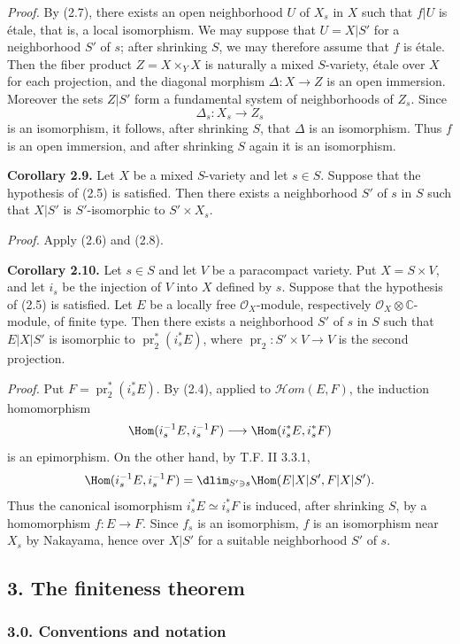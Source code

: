\documentclass[11pt]{article}
\begin{document}
\emph{Proof.} By (2.7), there exists an open neighborhood $U$ of $X_s$ in $X$ such that $f|U$ is étale, that is, a local isomorphism. We may suppose that $U=X|S'$ for a neighborhood $S'$ of $s$; after shrinking $S$, we may therefore assume that $f$ is étale. Then the fiber product $Z=X\times_YX$ is naturally a mixed $S$-variety, étale over $X$ for each projection, and the diagonal morphism $\Delta:X\to Z$ is an open immersion. Moreover the sets $Z|S'$ form a fundamental system of neighborhoods of $Z_s$. Since
\[
 \Delta_s:X_s\longrightarrow Z_s
\]
is an isomorphism, it follows, after shrinking $S$, that $\Delta$ is an isomorphism. Thus $f$ is an open immersion, and after shrinking $S$ again it is an isomorphism.

\textbf{Corollary 2.9.} Let $X$ be a mixed $S$-variety and let $s\in S$. Suppose that the hypothesis of (2.5) is satisfied. Then there exists a neighborhood $S'$ of $s$ in $S$ such that $X|S'$ is $S'$-isomorphic to $S'\times X_s$.

\emph{Proof.} Apply (2.6) and (2.8).

\textbf{Corollary 2.10.} Let $s\in S$ and let $V$ be a paracompact variety. Put $X=S\times V$, and let $i_s$ be the injection of $V$ into $X$ defined by $s$. Suppose that the hypothesis of (2.5) is satisfied. Let $E$ be a locally free $\mathcal O_X$-module, respectively $\mathcal O_X\otimes\mathbb C$-module, of finite type. Then there exists a neighborhood $S'$ of $s$ in $S$ such that $E|X|S'$ is isomorphic to $\operatorname{pr}_2^*(i_s^*E)$, where $\operatorname{pr}_2:S'\times V\to V$ is the second projection.

\emph{Proof.} Put $F=\operatorname{pr}_2^*(i_s^*E)$. By (2.4), applied to $\mathcal Hom(E,F)$, the induction homomorphism
\[
 \Hom(i_s^{-1}E,i_s^{-1}F)\longrightarrow \Hom(i_s^*E,i_s^*F)
\]
is an epimorphism. On the other hand, by T.F. II 3.3.1,
\[
 \Hom(i_s^{-1}E,i_s^{-1}F)
 =\dlim_{S'\ni s}\Hom(E|X|S',F|X|S') .
\]
Thus the canonical isomorphism $i_s^*E\simeq i_s^*F$ is induced, after shrinking $S$, by a homomorphism $f:E\to F$. Since $f_s$ is an isomorphism, $f$ is an isomorphism near $X_s$ by Nakayama, hence over $X|S'$ for a suitable neighborhood $S'$ of $s$.

\subsection*{3. The finiteness theorem}

\subsubsection*{3.0. Conventions and notation}
\end{document}
